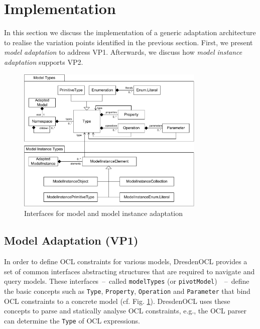 \section{Implementation}
\label{sec:implementation}
	In this section we discuss the implementation of a generic adaptation
	architecture to realise the
	variation points identified in the previous section. First, we present
	\emph{model adaptation} to address VP1. Afterwards, we discuss how \emph{model
	instance adaptation} supports VP2.
	
	\begin{figure}[!t]
			\centering
				\includegraphics[width=0.80\textwidth]{figures/coreconcepts.pdf}
			\caption{
			Interfaces for model and model instance adaptation
			}
			\label{fig:coreconcepts}
		\end{figure}
			
			

\subsection{Model Adaptation (VP1)}

	In order to define OCL constraints for various models,
	DresdenOCL provides a set of common interfaces abstracting structures
	that are required to navigate and query models.
	These interfaces~--~called \texttt{modelTypes} (or \texttt{pivotModel})~\cite{braeuerOCL07}~--~define
	the basic	concepts such as \texttt{Type}, \texttt{Property}, \texttt{Operation} and \texttt{Parameter}
	that bind OCL constraints to a concrete model (cf. Fig. \ref{fig:coreconcepts}).
	DresdenOCL uses these concepts to parse and statically analyse OCL constraints, 
	e.g., the OCL parser can determine the \texttt{Type} of OCL expressions.
	
